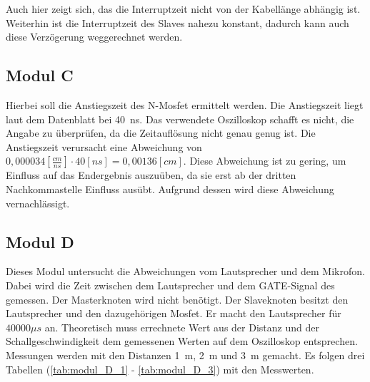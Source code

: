 Auch hier zeigt sich, das die Interruptzeit nicht von der Kabellänge abhängig ist. Weiterhin ist die Interruptzeit des Slaves nahezu konstant, dadurch kann auch diese Verzögerung weggerechnet werden. 

\subsection{Modul C}
Hierbei soll die Anstiegszeit des N-Mosfet ermittelt werden. Die Anstiegszeit liegt laut dem Datenblatt bei \SI{40}{ns}. Das verwendete Oszilloskop schafft es nicht, die Angabe zu überprüfen, da die Zeitauflösung nicht genau genug ist. Die Anstiegszeit verursacht eine Abweichung von $0,000034 [\frac{cm}{ns}] \cdot 40 [ns] = 0,00136 [\si{cm}]$. Diese Abweichung ist zu gering, um Einfluss auf das Endergebnis auszuüben, da sie erst ab der dritten Nachkommastelle Einfluss ausübt. Aufgrund dessen wird diese Abweichung vernachlässigt.

\subsection{Modul D}
Dieses Modul untersucht die Abweichungen vom Lautsprecher und dem Mikrofon. Dabei wird die Zeit zwischen dem Lautsprecher und dem \si{GATE}-Signal des \microphone \platz gemessen. Der Masterknoten wird nicht benötigt. Der Slaveknoten besitzt den Lautsprecher und den dazugehörigen Mosfet. Er macht den Lautsprecher für $40000 \si{\mu s}$ an. Theoretisch muss errechnete Wert aus der Distanz und der Schallgeschwindigkeit dem gemessenen Werten auf dem Oszilloskop entsprechen. Messungen werden mit den Distanzen \SI{1}{m}, \SI{2}{m} und \SI{3}{m} gemacht. Es folgen drei Tabellen (\ref{tab:modul_D_1} - \ref{tab:modul_D_3}) mit den Messwerten. 

